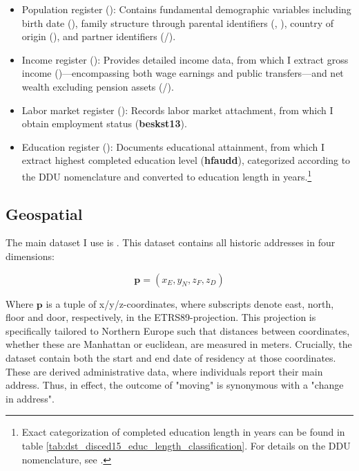 \documentclass[main.tex]{subfiles}
\begin{document}
\begin{itemize}
    \item Population register (): Contains fundamental demographic variables including birth date (), family structure through parental identifiers (, ), country of origin (), and partner identifiers (/).
    
    \item Income register (): Provides detailed income data, from which I extract gross income ()—encompassing both wage earnings and public transfers—and net wealth excluding pension assets (/).
    
    \item Labor market register (): Records labor market attachment, from which I obtain employment status (\textbf{beskst13}).
    
    \item Education register (): Documents educational attainment, from which I extract highest completed education level (\textbf{hfaudd}), categorized according to the DDU nomenclature and converted to education length in years.\footnote{Exact categorization of completed education length in years can be found in table \ref{tab:dst_disced15_educ_length_classification}. For details on the DDU nomenclature, see \textcite{dst_ddu_edu}.}
\end{itemize}

\subsection{Geospatial}
\label{sec:data_geospatial}
The main dataset I use is . This dataset contains all historic addresses in four dimensions:

\begin{equation}
    \mathbf{p} = (x_E, y_N, z_F, z_D)
\end{equation}

\noindent
Where $\textbf{p}$ is a tuple of x/y/z-coordinates, where subscripts denote east, north, floor and door, respectively, in the ETRS89-projection. This projection is specifically tailored to Northern Europe such that distances between coordinates, whether these are Manhattan or euclidean, are measured in meters. Crucially, the dataset contain both the start and end date of residency at those coordinates. These are derived administrative data, where individuals report their main address. Thus, in effect, the outcome of "moving" is synonymous with a "change in address". 
\end{document}
